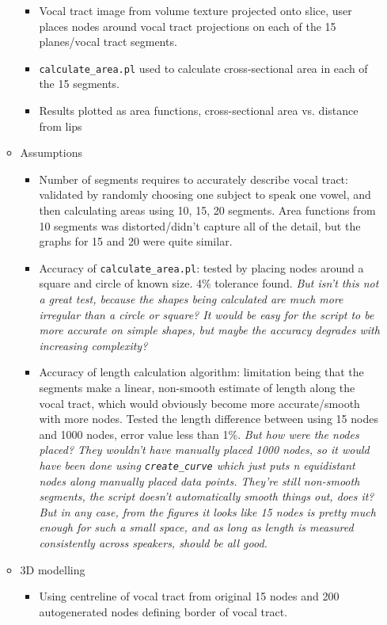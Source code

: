 \documentclass{article}
\begin{document}
\begin{itemize}
\begin{itemize}
\begin{itemize}
            \item Vocal tract image from volume texture projected onto slice, user places nodes around vocal tract projections on each of the 15 planes/vocal tract segments.
            \item \texttt{calculate\_area.pl} used to calculate cross-sectional area in each of the 15 segments.
            \item Results plotted as area functions, cross-sectional area vs. distance from lips
        \end{itemize}
        \item Assumptions
        \begin{itemize}
            \item Number of segments requires to accurately describe vocal tract: validated by randomly choosing one subject to speak one vowel, and then calculating areas using 10, 15, 20 segments. Area functions from 10 segments was distorted/didn't capture all of the detail, but the graphs for 15 and 20 were quite similar.
            \item Accuracy of \texttt{calculate\_area.pl}: tested by placing nodes around a square and circle of known size. 4\% tolerance found. \emph{But isn't this not a great test, because the shapes being calculated are much more irregular than a circle or square? It would be easy for the script to be more accurate on simple shapes, but maybe the accuracy degrades with increasing complexity?}
            \item Accuracy of length calculation algorithm: limitation being that the segments make a linear, non-smooth estimate of length along the vocal tract, which would obviously become more accurate/smooth with more nodes. Tested the length difference between using 15 nodes and 1000 nodes, error value less than 1\%. \emph{But how were the nodes placed? They wouldn't have manually placed 1000 nodes, so it would have been done using \texttt{create\_curve} which just puts n equidistant nodes along manually placed data points. They're still non-smooth segments, the script doesn't automatically smooth things out, does it? But in any case, from the figures it looks like 15 nodes is pretty much enough for such a small space, and as long as length is measured consistently across speakers, should be all good.}
        \end{itemize}
        \item 3D modelling
        \begin{itemize}
            \item Using centreline of vocal tract from original 15 nodes and 200 autogenerated nodes defining border of vocal tract.

\end{itemize}
\end{itemize}
\end{itemize}
\end{document}
